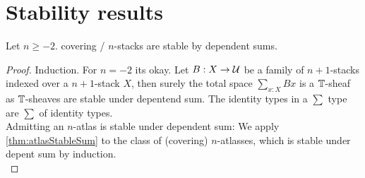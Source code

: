 \documentclass{article}
\begin{document}
\section{Stability results}
\begin{theorem}{\label{thm:stabSums}}
    Let $n \ge -2$. covering /  $n$-stacks are stable by dependent sums.
\end{theorem}
\begin{proof}
    Induction.
    For $n = -2$ its okay.    
    Let $B : X \to \mathcal{U}$ be a family of  $n+1$-stacks indexed over a  $n+1$-stack $X$, then surely the total space $\sum_{x : X} B x$ is a $\mathbb{T}$-sheaf as $\mathbb{T}$-sheaves are stable under depentend sum. 
    The identity types in a $\sum$ type are $\sum$ of identity types.\\ 
	Admitting an $n$-atlas is stable under dependent sum: We apply \ref{thm:atlasStableSum} to the class of (covering) $n$-atlasses, which is stable under depent sum by induction.
    \\ %
    
    
\end{proof}
\end{document}
